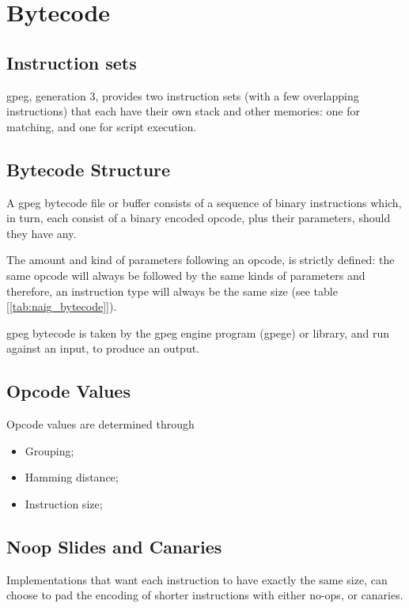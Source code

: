 \section{Bytecode}
\label{sec:bytecode}

\subsection{Instruction sets}

gpeg, generation 3, provides two instruction sets (with a few overlapping
instructions) that each have their own stack and other memories:
one for matching, and one for script execution.



\subsection{Bytecode Structure}

A gpeg bytecode file or buffer consists of a sequence of binary
instructions which, in turn, each consist of a binary
encoded opcode, plus their parameters, should they have any.

The amount and kind of parameters following an opcode, is strictly
defined:
the same opcode will always be followed by the same kinds of parameters
and therefore, an instruction type will always be the same size
(see table [\ref{tab:naig_bytecode}]).

gpeg bytecode is taken by the gpeg engine program (gpege) or
library, and run against an input, to produce an output.

\subsection{Opcode Values}

Opcode values are determined through

\begin{itemize}
\item Grouping; 
\item Hamming distance;
\item Instruction size;
\end{itemize}

\subsection{Noop Slides and Canaries}

Implementations that want each instruction to have exactly the
same size, can choose to pad the encoding of shorter instructions
with either no-ops, or canaries.

